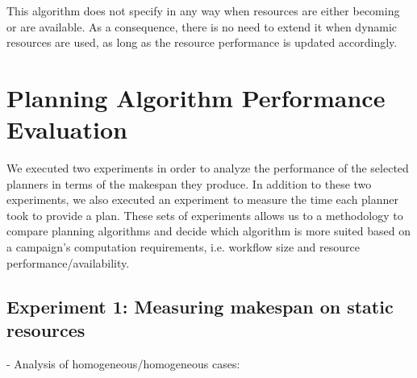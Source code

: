 This algorithm does not specify in any way when resources are either becoming or are available.
As a consequence, there is no need to extend it when dynamic resources are used, as long as the resource performance is updated accordingly.

\section{Planning Algorithm Performance Evaluation}
\label{sec:algo_perf_comp}

We executed two experiments in order to analyze the performance of the selected planners in terms of the makespan they produce.
In addition to these two experiments, we also executed an experiment to measure the time each planner took to provide a plan.
These sets of experiments allows us to a methodology to compare planning algorithms and decide which algorithm is more suited based on a campaign's computation requirements, i.e. workflow size and resource performance/availability.

\subsection{Experiment 1: Measuring  makespan on static resources}

- Analysis of homogeneous/homogeneous cases:

